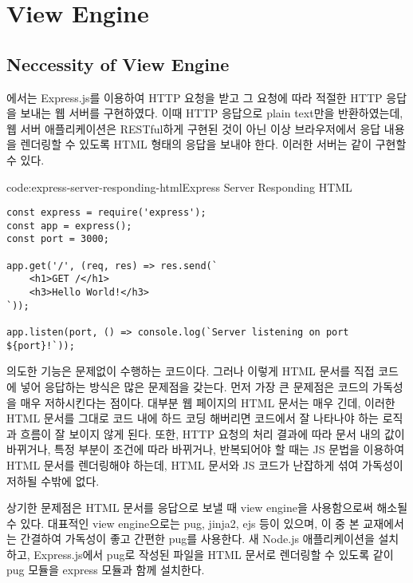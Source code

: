 \section{View Engine}\label{sect:view-engine}

\subsection*{Neccessity of View Engine}

에서는 Express.js를 이용하여 HTTP 요청을 받고 그 요청에 따라 적절한 HTTP 응답을 보내는 웹 서버를 구현하였다. 이때 HTTP 응답으로 plain text만을 반환하였는데, 웹 서버 애플리케이션은 RESTful하게 구현된 것이 아닌 이상 브라우저에서 응답 내용을 렌더링할 수 있도록 HTML 형태의 응답을 보내야 한다. 이러한 서버는 \과 같이 구현할 수 있다.

\begin{codeenv}{code:express-server-responding-html}{Express Server Responding HTML}\begin{verbatim}
const express = require('express');
const app = express();
const port = 3000;

app.get('/', (req, res) => res.send(`
    <h1>GET /</h1>
    <h3>Hello World!</h3>
`));

app.listen(port, () => console.log(`Server listening on port ${port}!`));
\end{verbatim}
\end{codeenv}

\은 의도한 기능은 문제없이 수행하는 코드이다. 그러나 이렇게 HTML 문서를 직접 코드에 넣어 응답하는 방식은 많은 문제점을 갖는다. 먼저 가장 큰 문제점은 코드의 가독성을 매우 저하시킨다는 점이다. 대부분 웹 페이지의 HTML 문서는 매우 긴데, 이러한 HTML 문서를 그대로 코드 내에 하드 코딩 해버리면 코드에서 잘 나타나야 하는 로직과 흐름이 잘 보이지 않게 된다. 또한, HTTP 요청의 처리 결과에 따라 문서 내의 값이 바뀌거나, 특정 부분이 조건에 따라 바뀌거나, 반복되어야 할 때는 JS 문법을 이용하여 HTML 문서를 렌더링해야 하는데, HTML 문서와 JS 코드가 난잡하게 섞여 가독성이 저하될 수밖에 없다.

상기한 문제점은 HTML 문서를 응답으로 보낼 때 view engine을 사용함으로써 해소될 수 있다. 대표적인 view engine으로는 pug, jinja2, ejs 등이 있으며, 이 중 본 교재에서는 간결하여 가독성이 좋고 간편한 pug를 사용한다. 새 Node.js 애플리케이션을 설치하고, Express.js에서 pug로 작성된 파일을 HTML 문서로 렌더링할 수 있도록 \와 같이 pug 모듈을 express 모듈과 함께 설치한다.

